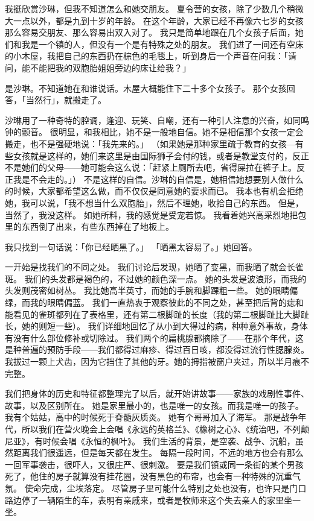 \documentclass[UTF8]{ctexart}
\begin{document}
我挺欣赏沙琳，但我不知道怎么和她交朋友。
夏令营的女孩，除了少数几个稍微大一点以外，都是九到十岁的年龄。
在这个年龄，大家已经不再像六七岁的女孩那么容易交朋友、那么容易出双入对了。
我只是简单地跟在几个女孩子后面，她们和我是一个镇的人，但没有一个是有特殊之处的朋友。
我们进了一间还有空床的小木屋，我把自己的东西扔在棕色的毛毯上，听到身后一个声音在问我：「请问，能不能把我的双胞胎姐姐旁边的床让给我？」

是沙琳。不知道她在和谁说话。木屋大概能住下二十多个女孩子。
那个女孩回答，「当然行」，就搬走了。

沙琳用了一种奇特的腔调，逢迎、玩笑、自嘲，还有一种引人注意的兴奋，如同鸣钟的颤音。
很明显，和我相比，她不是一般地自信。她不是相信那个女孩一定会搬走，也不是强硬地说：「我先来的。」
（如果她是那种家里疏于教育的女孩—有些女孩就是这样的，她们来这里是由国际狮子会付的钱，或者是教堂支付的，反正不是她们的父母——她可能会这么说：「赶紧上厕所去吧，省得屎拉在裤子上。反正我是不会走的。」）
不是这样的自信。沙琳的自信是，她相信她想要别人做什么的时候，大家都希望这么做，而不仅仅是同意她的要求而已。
我本也有机会拒绝她，我可以说，「我不想当什么双胞胎」，然后不理她，收拾自己的东西。
但是，当然了，我没这样。
如她所料，我的感觉是受宠若惊。
我看着她兴高采烈地把包里的东西倒了出来，有些东西掉在了地板上。

我只找到一句话说：「你已经晒黑了。」
「晒黑太容易了。」她回答。

一开始是找我们的不同之处。
我们讨论后发现，她晒了变黑，而我晒了就会长雀斑。
我们的头发都是褐色的，不过她的颜色深一点。
她的头发是波浪形，而我的头发则茂密如树丛。
我比她高半英寸，而她的手腕和脚踝粗一些。
她的眼睛偏绿，而我的眼睛偏蓝。
我们一直热衷于观察彼此的不同之处，甚至把后背的痣和能看见的雀斑都列在了表格里，还有第二根脚趾的长度（我的第二根脚趾比大脚趾长，她的则短一些）。
我们详细地回忆了从小到大得过的病，种种意外事故，身体有没有什么部位修补或切除过。
我们两个的扁桃腺都摘除了——在那个年代，这是种普遍的预防手段——我们都得过麻疹、得过百日咳，都没得过流行性腮腺炎。
我拔过一颗上犬齿，因为它挡住了其他的牙。她的拇指被窗户夹过，所以半月痕不完整。

我们把身体的历史和特征都整理完了以后，就开始讲故事——家族的戏剧性事件、故事，以及区别所在。
她是家里最小的，也是唯一的女孩。而我是唯一的孩子。
我有个姑姑，高中的时候死于脊髓灰质炎。
她有个哥哥加入了海军。
那是战争年代，所以我们在营火晚会上会唱《永远的英格兰》、《橡树之心》、《统治吧，不列颠尼亚》，有时候会唱《永恒的枫叶》。
我们生活的背景，是空袭、战争、沉船，虽然距离我们很遥远，但是每天都在发生。
每隔一段时间，不远的地方也会有那么一回军事袭击，很吓人，又很庄严、很刺激。
要是我们镇或同一条街的某个男孩死了，他住的房子就算没有挂花圈，没有黑色的布帘，也会有一种特殊的沉重气氛。
使命完成，尘埃落定。
尽管房子里可能什么特别之处也没有，也许只是门口路边停了一辆陌生的车，表明有亲戚来，或者是牧师来这个失去亲人的家里坐一坐。
\end{document}
